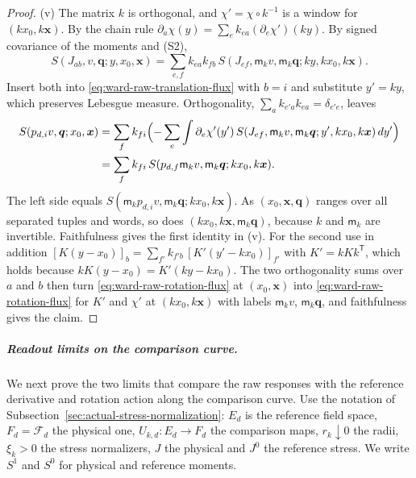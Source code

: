\begin{proof}
(v) The matrix $k$ is orthogonal, and $\chi'=\chi\circ k^{-1}$ is a window
for $(kx_0,k\boldsymbol x)$.  By the chain rule
$\partial_a\chi(y)=\sum_ek_{ea}(\partial_e\chi')(ky)$.  By signed
covariance of the moments and (S2),
\[
 S(J_{ab},v,\boldsymbol q;y,x_0,\boldsymbol x)
 =\sum_{e,f}k_{ea}k_{fb}\,
   S(J_{ef},\mathsf m_kv,\mathsf m_k\boldsymbol q;ky,kx_0,k\boldsymbol x).
\]
Insert both into \eqref{eq:ward-raw-translation-flux} with $b=i$ and
substitute $y'=ky$, which preserves Lebesgue measure.  Orthogonality,
$\sum_ak_{e'a}k_{ea}=\delta_{e'e}$, leaves
\begin{align*}
 S(p_{d,i}v,\boldsymbol q;x_0,\boldsymbol x)
 &=\sum_fk_{fi}\Bigl(-\sum_e\int\partial_e\chi'(y')\,
   S(J_{ef},\mathsf m_kv,\mathsf m_k\boldsymbol q;y',kx_0,k\boldsymbol x)
   \,dy'\Bigr)\\
 &=\sum_fk_{fi}\,
  S(p_{d,f}\mathsf m_kv,\mathsf m_k\boldsymbol q;kx_0,k\boldsymbol x).
\end{align*}
The left side equals
$S(\mathsf m_kp_{d,i}v,\mathsf m_k\boldsymbol q;kx_0,k\boldsymbol x)$.  As
$(x_0,\boldsymbol x,\boldsymbol q)$ ranges over all separated tuples and
words, so does $(kx_0,k\boldsymbol x,\mathsf m_k\boldsymbol q)$, because
$k$ and $\mathsf m_k$ are invertible.  Faithfulness gives the first
identity in (v).  For the second use in addition
$[K(y-x_0)]_b=\sum_{f'}k_{f'b}\,[K'(y'-kx_0)]_{f'}$ with
$K'=kKk^{\mathsf T}$, which holds because
$kK(y-x_0)=K'(ky-kx_0)$.  The two orthogonality sums over $a$ and $b$ then
turn \eqref{eq:ward-raw-rotation-flux} at $(x_0,\boldsymbol x)$ into
\eqref{eq:ward-raw-rotation-flux} for $K'$ and $\chi'$ at
$(kx_0,k\boldsymbol x)$ with labels $\mathsf m_kv$, $\mathsf m_k\boldsymbol q$,
and faithfulness gives the claim.
\end{proof}

\subparagraph{Readout limits on the comparison curve.}
We next prove the two limits that compare the raw responses with the
reference derivative and rotation action along the comparison curve.  Use
the notation of Subsection~\ref{sec:actual-stress-normalization}: $E_d$ is the
reference field space, $F_d=\mathcal F_d$ the physical one,
$U_{k,d}:E_d\to F_d$ the comparison maps, $r_k\downarrow0$ the radii,
$\xi_k>0$ the stress normalizers, $J$ the physical and $J^0$ the reference
stress.  We write $S^1$ and $S^0$ for physical and reference moments.

